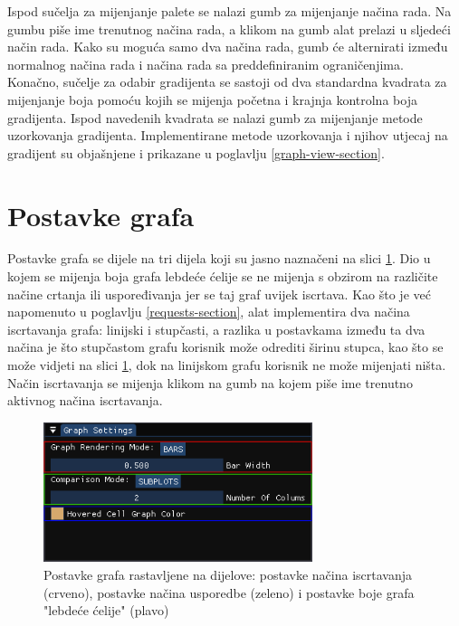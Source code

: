 \documentclass[times, utf8, diplomski]{fer}
\begin{document}
Ispod sučelja za mijenjanje palete se nalazi gumb za mijenjanje načina rada. Na gumbu piše ime trenutnog načina rada, a klikom na gumb alat prelazi u sljedeći način rada. Kako su moguća samo dva načina rada, gumb će alternirati između normalnog načina rada i načina rada sa preddefiniranim ograničenjima.\\

Konačno, sučelje za odabir gradijenta se sastoji od dva standardna kvadrata za mijenjanje boja pomoću kojih se mijenja početna i krajnja kontrolna boja gradijenta. Ispod navedenih kvadrata se nalazi gumb za mijenjanje metode uzorkovanja gradijenta. Implementirane metode uzorkovanja i njihov utjecaj na gradijent su objašnjene i prikazane u poglavlju \ref{graph-view-section}.

\section{Postavke grafa} \label{graph-settings-section}

Postavke grafa se dijele na tri dijela koji su jasno naznačeni na slici \ref{fig:graph-settings-segmented}. Dio u kojem se mijenja boja grafa lebdeće ćelije se ne mijenja s obzirom na različite načine crtanja ili uspoređivanja jer se taj graf uvijek iscrtava. Kao što je već napomenuto u poglavlju \ref{requests-section}, alat implementira dva načina iscrtavanja grafa: linijski i stupčasti, a razlika u postavkama između ta dva načina je što stupčastom grafu korisnik može odrediti širinu stupca, kao što se može vidjeti na slici \ref{fig:graph-settings-segmented}, dok na linijskom grafu korisnik ne može mijenjati ništa. Način iscrtavanja se mijenja klikom na gumb na kojem piše ime trenutno aktivnog načina iscrtavanja.

\begin{figure} [H]
	\centering
    \includegraphics[width=0.7\textwidth]{graph_settings_subplots_segmented.png}
    \caption{Postavke grafa rastavljene na dijelove: postavke načina iscrtavanja (crveno), postavke načina usporedbe (zeleno) i postavke boje grafa "lebdeće ćelije" (plavo)}
    \label{fig:graph-settings-segmented}
\end{figure}
\end{document}

